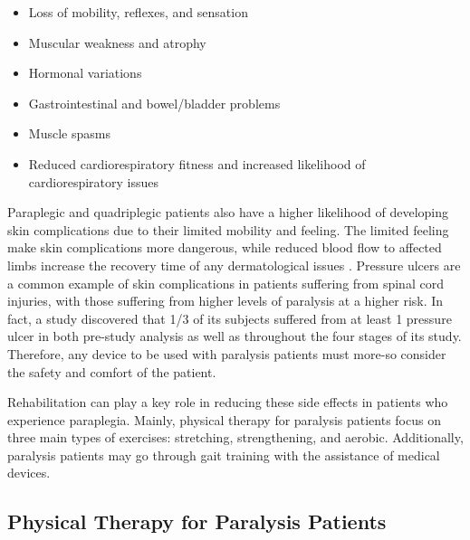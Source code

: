 \begin{itemize}
    \item Loss of mobility, reflexes, and sensation
    \item Muscular weakness and atrophy
    \item Hormonal variations
    \item Gastrointestinal and bowel/bladder problems
    \item Muscle spasms
    \item Reduced cardiorespiratory fitness and increased likelihood of cardiorespiratory issues
\end{itemize}

Paraplegic and quadriplegic patients also have a higher likelihood of developing skin complications due to their limited mobility and feeling. The limited feeling make skin complications more dangerous, while reduced blood flow to affected limbs increase the recovery time of any dermatological issues \cite{SPISecondaryEffects}. Pressure ulcers are a common example of skin complications in patients suffering from spinal cord injuries, with those suffering from higher levels of paralysis at a higher risk. In fact, a study \cite{PressureUlcerRiskParalysis} discovered that 1/3 of its subjects suffered from at least 1 pressure ulcer in both pre-study analysis as well as throughout the four stages of its study. Therefore, any device to be used with paralysis patients must more-so consider the safety and comfort of the patient.

Rehabilitation can play a key role in reducing these side effects in patients who experience paraplegia. Mainly, physical therapy for paralysis patients focus on three main types of exercises: stretching, strengthening, and aerobic. Additionally, paralysis patients may go through gait training with the assistance of medical devices.

\subsection{Physical Therapy for Paralysis Patients}


